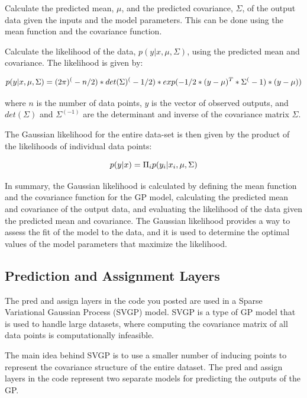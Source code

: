 \documentclass[12pt,a4paper]{report}
\begin{document}
Calculate the predicted mean, $\mu$, and the predicted covariance, $\Sigma$, of the output data given the inputs and the model parameters. 
This can be done using the mean function and the covariance function.

Calculate the likelihood of the data, $p(y|x, \mu, \Sigma)$, using the predicted mean and covariance. 
The likelihood is given by:

\begin{equation}
    \centering
    p(y|x, \mu, \Sigma) = (2\pi)^(-n/2) * det(\Sigma)^(-1/2) * exp(-1/2 * (y - \mu)^T * \Sigma^(-1) * (y - \mu))
\end{equation}

where $n$ is the number of data points, $y$ is the vector of observed outputs, and $det(\Sigma)$ and $\Sigma^(-1)$ are the determinant and inverse of the covariance matrix $\Sigma$.

The Gaussian likelihood for the entire data-set is then given by the product of the likelihoods of individual data points:

\begin{equation}
    \centering
    p(y|x) = \Pi_i p(y_i|x_i, \mu, \Sigma) 
\end{equation}

In summary, the Gaussian likelihood is calculated by defining the mean function and the covariance function for the GP model, calculating the predicted mean and covariance of the output data, and evaluating the likelihood of the data given the predicted mean and covariance. 
The Gaussian likelihood provides a way to assess the fit of the model to the data, and it is used to determine the optimal values of the model parameters that maximize the likelihood.

\subsection{Prediction and Assignment Layers}

The pred and assign layers in the code you posted are used in a Sparse Variational Gaussian Process (SVGP) model. 
SVGP is a type of GP model that is used to handle large datasets, where computing the covariance matrix of all data points is computationally infeasible.

The main idea behind SVGP is to use a smaller number of inducing points to represent the covariance structure of the entire dataset. 
The pred and assign layers in the code represent two separate models for predicting the outputs of the GP.
\end{document}
